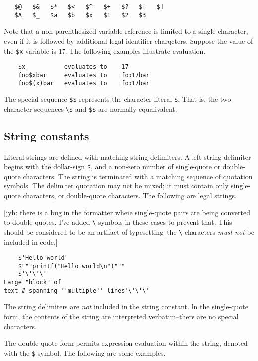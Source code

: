 \begin{verbatim}
   $@   $&   $*   $<   $^   $+   $?   $[   $]
   $A   $_   $a   $b   $x   $1   $2   $3
\end{verbatim}

Note that a non-parenthesized variable reference is limited to a single character, even if it is
followed by additional legal identifier charqcters.  Suppose the value of the \verb+$x+ variable is
17.  The following examples illustrate evaluation.

\begin{verbatim}
    $x           evaluates to    17
    foo$xbar     evaluates to    foo17bar
    foo$(x)bar   evaluates to    foo17bar
\end{verbatim}

The special sequence \verb+$$+ represents the character literal \verb+$+.  That is, the
two-character sequences \verb+\$+ and \verb+$$+ are normally equalivalent.

\subsection{String constants}

Literal strings are defined with matching string delimiters.  A left string delimiter begins with
the dollar-sign \verb+$+, and a non-zero number of single-quote or double-quote characters.  The
string is terminated with a matching sequence of quotation symbols.  The delimiter quotation may not
be mixed; it must contain only single-quote characters, or double-quote characters.  The following
are legal strings.

[jyh: there is a bug in the formatter where single-quote pairs are being converted to double-quotes.
I've added \verb+\+ symbols in these cases to prevent that.  This should be considered to be an artifact of
typesetting--the \verb+\+ characters \emph{must not} be included in code.]

\begin{verbatim}
    $'Hello world'
    $"""printf("Hello world\n")"""
    $'\'\'\'
Large "block" of
text # spanning ''multiple'' lines'\'\'\'
\end{verbatim}

The string delimiters are \emph{not} included in the string constant.  In the single-quote form,
the contents of the string are interpreted verbatim--there are no special characters.

The double-quote form permits expression evaluation within the string, denoted with the \verb+$+ symbol.
The following are some examples.

